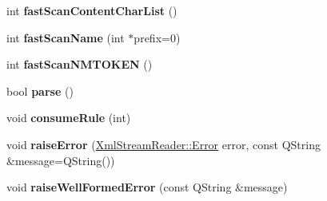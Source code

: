 \begin{DoxyCompactItemize}
\mbox{\label{class_xml_stream_reader_private_a1fa34cde06b720dee576a705f32742d7}} 
int {\bfseries fast\+Scan\+Content\+Char\+List} ()
\item 
\mbox{\label{class_xml_stream_reader_private_ac643a512e64413a01183f90894518079}} 
int {\bfseries fast\+Scan\+Name} (int $\ast$prefix=0)
\item 
\mbox{\label{class_xml_stream_reader_private_a7489f98a19efad22b2e8e7438b0d98b8}} 
int {\bfseries fast\+Scan\+N\+M\+T\+O\+K\+EN} ()
\item 
\mbox{\label{class_xml_stream_reader_private_aa02e0f2b13faf9b3001d1461015a9952}} 
bool {\bfseries parse} ()
\item 
\mbox{\label{class_xml_stream_reader_private_a97d4dc5cfe4af128dae7de47dc2618a3}} 
void {\bfseries consume\+Rule} (int)
\item 
\mbox{\label{class_xml_stream_reader_private_a8f4e0602df3dfa5171ad6fd6b680cb40}} 
void {\bfseries raise\+Error} (\hyperlink{class_xml_stream_reader_ae7aa6749ae6e9de9bcb6f084a9884286}{Xml\+Stream\+Reader\+::\+Error} error, const Q\+String \&message=Q\+String())
\item 
\mbox{\label{class_xml_stream_reader_private_aee2508cd6a0eba0eb32cacd7bcb813b9}} 
void {\bfseries raise\+Well\+Formed\+Error} (const Q\+String \&message)
\end{DoxyCompactItemize}
